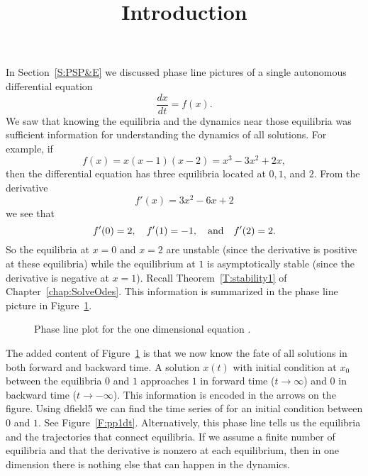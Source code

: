 \documentclass{ximera}
\title{Introduction}
\begin{document}
\begin{abstract}
\end{abstract}
\maketitle


\label{S:introAPNS}

In Section~\ref{S:PSP&E} we discussed phase line pictures of 
a single autonomous 
differential equation 
\[
\frac{dx}{dt} = f(x).
\]
We saw that knowing the equilibria and the dynamics 
near those equilibria was sufficient information for understanding 
the dynamics of all solutions.  For example, if 
\begin{equation}  \label{e:1dexample}
f(x) = x(x-1)(x-2)=x^3-3x^2+2x,
\end{equation}
then the differential equation has three equilibria located at 
$0,1$, and $2$.  From the derivative
\[
f'(x)=3x^2-6x+2
\]
we see that 
\[
f'(0)=2, \quad f'(1)=-1, \quad\mbox{and}\quad f'(2)=2.
\]
So the equilibria at $x=0$ and $x=2$ are unstable 
(since the derivative 
is positive at these equilibria) while the equilibrium at $1$ is 
asymptotically stable (since the derivative is negative at $x=1$). 
Recall Theorem~\ref{T:stability1} of Chapter~\ref{chap:SolveOdes}.  
This information is summarized in the phase line picture in 
Figure~\ref{F:pp1d}.

\begin{figure}[htb]
           \centerline{%
            }
           \caption{Phase line plot for the one dimensional equation
	\protect{}.}
           \label{F:pp1d}
\end{figure}

The added content of Figure~\ref{F:pp1d} is that we now know the 
fate of all solutions in both forward and backward time.  A 
solution $x(t)$ with initial condition at $x_0$ between the 
equilibria $0$ and $1$ approaches $1$ in forward time
($t\to\infty$) and $0$ in backward time ($t\to -\infty$).  
This information is 
encoded in the arrows on the figure.  Using {\sf dfield5}
 we can 
find the time series of  for an initial condition 
between $0$ and $1$.  See Figure~\ref{F:pp1dt}. Alternatively, this  
phase line tells us the equilibria and the trajectories that connect 
equilibria.  If we assume a finite number of equilibria and that the
derivative is nonzero at each equilibrium, then in one dimension 
there is nothing else that can happen in the dynamics.
\end{document}
